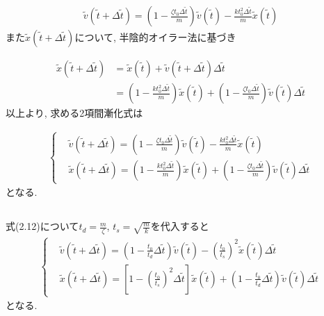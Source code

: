 \documentclass[a4paper,dvipdfmx]{jarticle}
\begin{document}
\begin{align}
    \tilde{v}(\tilde{t} + \Delta \tilde{t}) = \left(1 - \frac{\zeta t_0 \Delta \tilde{t}}{m}\right) \tilde{v}(\tilde{t})
    - \frac{k t_0^2 \Delta \tilde{t}}{m} \tilde{x}(\tilde{t}) \tag{2.10}
\end{align}
また$\tilde{x}(\tilde{t} + \Delta \tilde{t})$について, 半陰的オイラー法に基づき

\begin{align*}
    \tilde{x}(\tilde{t} + \Delta \tilde{t}) &= \tilde{x}(\tilde{t}) + \tilde{v}(\tilde{t} + \Delta \tilde{t}) \Delta \tilde{t} \\
    &= \left(1 - \frac{k t_0^2 \Delta \tilde{t}}{m}\right) \tilde{x}(\tilde{t}) 
    + \left(1 - \frac{\zeta t_0 \Delta \tilde{t}}{m}\right) \tilde{v}(\tilde{t}) \Delta \tilde{t} \tag{2.11}
\end{align*}
以上より, 求める2項間漸化式は

\begin{subequations}
    \begin{align}
    \left\{
        \begin{aligned}
        & \tilde{v}(\tilde{t} + \Delta \tilde{t}) = \left(1 - \frac{\zeta t_0 \Delta \tilde{t}}{m}\right) \tilde{v}(\tilde{t})
        - \frac{k t_0^2 \Delta \tilde{t}}{m} \tilde{x}(\tilde{t})\\
        & \tilde{x}(\tilde{t} + \Delta \tilde{t}) = \left(1 - \frac{k t_0^2 \Delta \tilde{t}}{m}\right) \tilde{x}(\tilde{t}) 
        + \left(1 - \frac{\zeta t_0 \Delta \tilde{t}}{m}\right) \tilde{v}(\tilde{t}) \Delta \tilde{t}
        \end{aligned}
    \right. \tag{2.12}
    \end{align}
\end{subequations}
となる.

\subsection{}

\noindent
式(2.12)について$t_d = \frac{m}{\zeta}$, $t_s = \sqrt{\frac{m}{k}}$を代入すると
\begin{subequations}
    \begin{align}
    \left\{
        \begin{aligned}
        & \tilde{v}(\tilde{t} + \Delta \tilde{t}) = \left(1 - \frac{t_0}{t_d} \Delta \tilde{t} \right) \tilde{v}(\tilde{t})
        - \left(\frac{t_0}{t_s}\right)^2 \tilde{x}(\tilde{t}) \Delta \tilde{t}\\
        & \tilde{x}(\tilde{t} + \Delta \tilde{t}) = \left[1 - \left(\frac{t_0}{t_s}\right)^2 \Delta \tilde{t} \right] \tilde{x}(\tilde{t}) 
        + \left(1 - \frac{t_0}{t_d} \Delta \tilde{t} \right) \tilde{v}(\tilde{t}) \Delta \tilde{t}
        \end{aligned}
    \right. \tag{2.13}
    \end{align}
\end{subequations}
となる.
\end{document}
